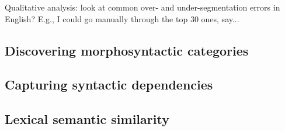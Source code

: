 Qualitative analysis: look at common over- and under-segmentation
errors in English? E.g., I could go manually through the top 30 ones,
say...

\subsection{Discovering morphosyntactic categories}
\label{sec:categories}

\subsection{Capturing syntactic dependencies}
\label{sec:dependencies}

\subsection{Lexical semantic similarity}
\label{sec:similarity}


